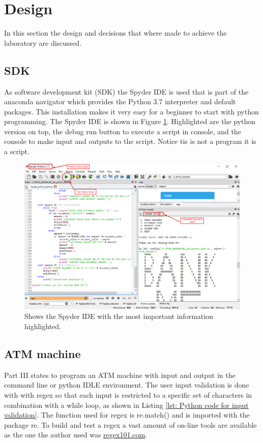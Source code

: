 \section{Design}\label{sec: Design}
In this section the design and decisions that where made to achieve the laboratory are discussed.

\subsection{SDK}\label{subsec: SDK}
As software development kit (SDK) the Spyder IDE is used that is part of the anaconda navigator which provides the Python 3.7 interpreter and default packages. This installation makes it very easy for a beginner to start with python programming. The Spyder IDE is shown in Figure \ref{fig: SpyderIDE}. Highlighted are the python version on top, the debug run button to execute a script in console, and the console to make input and outputs to the script. Notice tis is not a program it is a script.
\begin{figure}[H]
	\centering
	\includegraphics[width=1.0\textwidth]{01_images/SpyderIDE.PNG}
	\caption{Shows the Spyder IDE with the most important information highlighted.}
	\label{fig: SpyderIDE}
\end{figure}



\subsection{ATM machine}\label{subsec: Lab specification}
Part III states to program an ATM machine with input and output in the command line or python IDLE environment. The user input validation is done with with regex so that each input is restricted to a specific set of characters in combination with a while loop, as shown in Listing \ref{lst: Python code for input validation}. The function used for regex is re.match() and is imported with the package re. To build and test a regex a vast amount of on-line tools are available as the one the author used was \href{http://regex101.com/}{regex101.com}.

